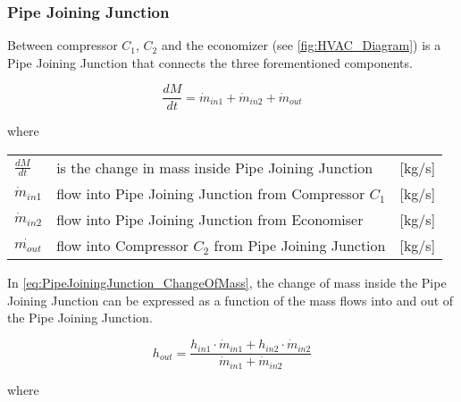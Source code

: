 \subsubsection{Pipe Joining Junction} 
Between compressor $ C_1 $, $ C_2 $ and the economizer (see \cref{fig:HVAC_Diagram}) is a Pipe Joining Junction that connects the three forementioned components.

\begin{equation} \label{eq:PipeJoiningJunction_ChangeOfMass}
	\frac{dM}{dt} = \dot{m}_{in1} + \dot{m}_{in2} + \dot{m}_{out}
\end{equation}

where 

\begin{center}
	\begin{tabular}{l p{8cm} l}
		$\frac{dM}{dt}$ & is the change in mass inside Pipe Joining Junction		 	& [\si{kg}/\si{s}]\\ 
		$\dot{m}_{in1}$ & flow into Pipe Joining Junction from Compressor $ C_1 $ 		& [\si{kg}/\si{s}]\\
		$\dot{m}_{in2}$ & flow into Pipe Joining Junction from Economiser 				& [\si{kg}/\si{s}]\\
		$\dot{m_{out}}$ & flow into Compressor $ C_2 $ from Pipe Joining Junction		& [\si{kg}/\si{s}]\\
	\end{tabular}
\end{center}

In \cref{eq:PipeJoiningJunction_ChangeOfMass}, the change of mass inside the Pipe Joining Junction can be expressed as a function of the mass flows into and out of the Pipe Joining Junction. 

\begin{equation} \label{eq:PipeJoiningJunction_Enthalpy}
	h_{out} = \frac{h_{in1} \cdot \dot{m}_{in1} + h_{in2} \cdot \dot{m}_{in2}}{ \dot{m}_{in1} + \dot{m}_{in2} }
\end{equation}

where


